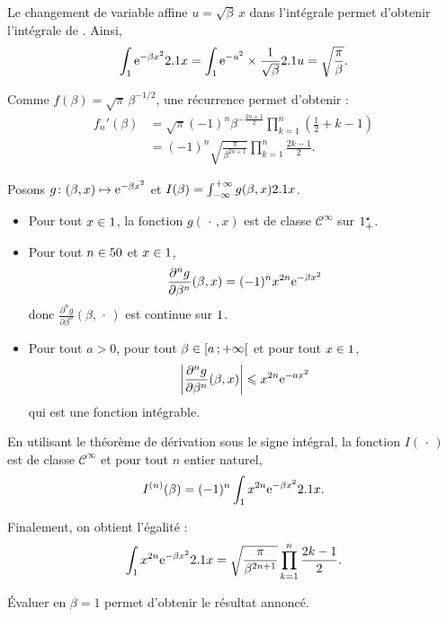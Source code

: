 \begin{solution}
\begin{reponses}
\item Le changement de variable affine $u = \sqrt{\beta}\, x$ dans l'intégrale permet d'obtenir l'intégrale de . Ainsi,
\[
\int_\R \e^{-\beta x^2} \d x
= \int_\R \e^{-u^2} \times \frac{1}{\sqrt{\beta}} \d u
= \sqrt{\frac{\pi}{\beta}}.
\]

\item Comme $f(\beta) = \sqrt{\pi}\, \beta^{-1/2}$, une récurrence permet d'obtenir :
\begin{align*}
f_n'(\beta)
&= \sqrt{\pi} (-1)^n \beta^{-\frac{2n+1}{2}} \prod_{k=1}^n \left(\frac{1}{2} + k - 1\right)\\
&= (-1)^n \sqrt{\frac{\pi}{\beta^{2n+1}}} \prod_{k=1}^n \frac{2k-1}{2}.
\end{align*}

\item Posons $\fonctionligne[g]{(\beta, x)}{\e^{-\beta x^2}}$ et $I(\beta) = \int_{-\infty}^{+\infty} g(\beta, x) \d x$.
\begin{itemize}
\item Pour tout $x \in \R$, la fonction $g(\,\cdot\,, x)$ est de classe $\mathscr{C}^\infty$ sur $\Rpe$.

\item Pour tout $n \in \N$ et $x \in \R$,
\[
\frac{\partial^n g}{\partial \beta^n}(\beta, x) = (-1)^n x^{2n} \e^{-\beta x^2}\]
donc $\frac{\partial^n g}{\partial \beta^n}(\beta, \,\cdot\,)$ est continue sur $\R$.

\item Pour tout $a > 0$, pour tout $\beta \in \interfo{a}{+\infty}$ et pour tout $x \in \R$,
\[
\module{\frac{\partial^n g}{\partial \beta^n}(\beta, x)} \leqslant x^{2n} \e^{-a x^2}
\]
qui est une fonction intégrable.
\end{itemize}

En utilisant le théorème de dérivation sous le signe intégral, la fonction $I(\,\cdot\,)$ est de classe $\mathscr{C}^\infty$ et pour tout $n$ entier naturel,
\[
I^{(n)}(\beta)
= (-1)^n \int_\R x^{2n} \e^{-\beta x^2} \d x.
\]

Finalement, on obtient l'égalité :
\[
\int_\R x^{2n} \e^{-\beta x^2} \d x
= \sqrt{\frac{\pi}{\beta^{2n+1}}} \prod_{k=1}^n \frac{2k-1}{2}.
\]

Évaluer en $\beta = 1$ permet d'obtenir le résultat annoncé.
\end{reponses}
\end{solution}


